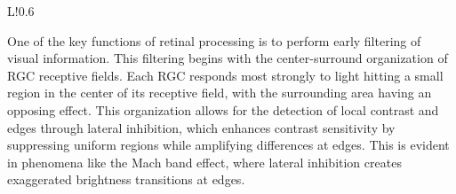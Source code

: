 \begin{wrapfigure}{L!}{0.6\textwidth}
\begin{tcolorbox}[every float=\centering, drop shadow, title=Lateral Inhibition ,colback=white,colframe=WMgreen,
  colbacktitle=WMgreen,]
  \label{fig:LatInhibition}
 \end{tcolorbox}
\end{wrapfigure}

One of the key functions of retinal processing is to perform early filtering of visual information. This filtering begins with the center-surround organization of RGC receptive fields. Each RGC responds most strongly to light hitting a small region in the center of its receptive field, with the surrounding area having an opposing effect. This organization allows for the detection of local contrast and edges through lateral inhibition, which enhances contrast sensitivity by suppressing uniform regions while amplifying differences at edges. This is evident in phenomena like the Mach band effect, where lateral inhibition creates exaggerated brightness transitions at edges.

